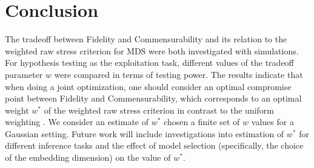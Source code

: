 \documentclass[12pt]{article} %
\begin{document}

\section{Conclusion}
 The tradeoff between Fidelity and Commensurability and its relation to the weighted raw stress criterion for MDS were both investigated with simulations.
   For  hypothesis testing as the exploitation task, different values of the tradeoff parameter $w$ were compared in terms of testing power.
    The results indicate that when doing a joint optimization, one should consider an optimal compromise point between Fidelity and Commensurability,
       which corresponds to an optimal weight $w^*$ of the weighted raw stress criterion in contrast to the uniform weighting . We consider an estimate of $w^*$ chosen a finite set of $w$ values for a Gaussian setting. Future work will include investigations into estimation of $w^*$  for different inference tasks and the effect of model selection (specifically, the choice of the embedding dimension) on the value of $w^*$. 
        




\end{document}

